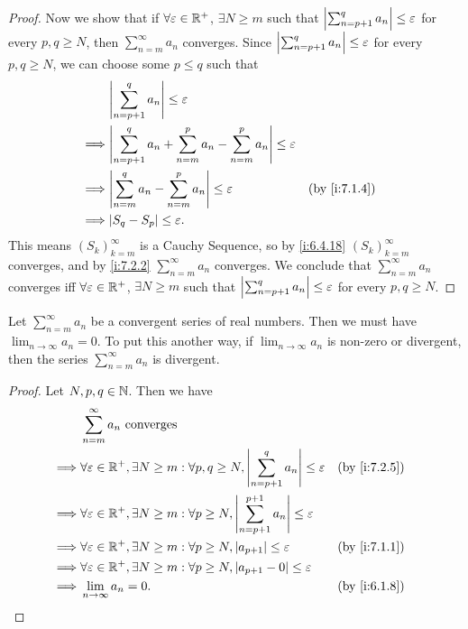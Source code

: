 \begin{proof}
  Now we show that if \(\forall \varepsilon \in \mathbb{R}^+\), \(\exists N \geq m\) such that \(\left\lvert\sum_{n = p + 1}^q a_n\right\rvert \leq \varepsilon\) for every \(p, q \geq N\), then \(\sum_{n = m}^\infty a_n\) converges.
  Since \(\left\lvert\sum_{n = p + 1}^q a_n\right\rvert \leq \varepsilon\) for every \(p, q \geq N\), we can choose some \(p \leq q\) such that
  \begin{align*}
             & \abs{\sum_{n = p + 1}^q a_n} \leq \varepsilon                                                             \\
    \implies & \abs{\sum_{n = p + 1}^q a_n + \sum_{n = m}^p a_n - \sum_{n = m}^p a_n} \leq \varepsilon                   \\
    \implies & \abs{\sum_{n = m}^q a_n - \sum_{n = m}^p a_n} \leq \varepsilon                          &  & \by{i:7.1.4} \\
    \implies & \abs{S_q - S_p} \leq \varepsilon.
  \end{align*}
  This means \((S_k)_{k = m}^\infty\) is a Cauchy Sequence, so by \cref{i:6.4.18} \((S_k)_{k = m}^\infty\) converges, and by \cref{i:7.2.2} \(\sum_{n = m}^\infty a_n\) converges.
  We conclude that \(\sum_{n = m}^\infty a_n\) converges iff \(\forall \varepsilon \in \mathbb{R}^+\), \(\exists N \geq m\) such that \(\left\lvert\sum_{n = p + 1}^q a_n\right\rvert \leq \varepsilon\) for every \(p, q \geq N\).
\end{proof}

\begin{cor}\label{i:7.2.6}
  Let \(\sum_{n = m}^\infty a_n\) be a convergent series of real numbers.
  Then we must have \(\lim_{n \to \infty} a_n = 0\).
  To put this another way, if \(\lim_{n \to \infty} a_n\) is non-zero or divergent, then the series \(\sum_{n = m}^\infty a_n\) is divergent.
\end{cor}

\begin{proof}
  Let \(N, p, q \in \mathbb{N}\).
  Then we have
  \begin{align*}
             & \sum_{n = m}^\infty a_n \text{ converges}                                                                                                \\
    \implies & \forall \varepsilon \in \R^+, \exists N \geq m : \forall p, q \geq N, \abs{\sum_{n = p + 1}^q a_n} \leq \varepsilon    &  & \by{i:7.2.5} \\
    \implies & \forall \varepsilon \in \R^+, \exists N \geq m : \forall p \geq N, \abs{\sum_{n = p + 1}^{p + 1} a_n} \leq \varepsilon                   \\
    \implies & \forall \varepsilon \in \R^+, \exists N \geq m : \forall p \geq N, \abs{a_{p + 1}} \leq \varepsilon                    &  & \by{i:7.1.1} \\
    \implies & \forall \varepsilon \in \R^+, \exists N \geq m : \forall p \geq N, \abs{a_{p + 1} - 0} \leq \varepsilon                                  \\
    \implies & \lim_{n \to \infty} a_n = 0.                                                                                           &  & \by{i:6.1.8}
  \end{align*}
\end{proof}

